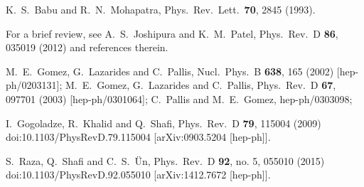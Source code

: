 \documentclass[12pt]{article}
\begin{document}
\begin{thebibliography}{99}
  K.~S.~Babu and R.~N.~Mohapatra,
  Phys.\ Rev.\ Lett.\  {\bf 70}, 2845 (1993).

 For a brief review, see  A.~S.~Joshipura and K.~M.~Patel,
  Phys.\ Rev.\ D {\bf 86}, 035019 (2012) and references therein.

  M.~E.~Gomez, G.~Lazarides and C.~Pallis,
  Nucl.\ Phys.\ B {\bf 638}, 165 (2002)
  [hep-ph/0203131];
  M.~E.~Gomez, G.~Lazarides and C.~Pallis,
  Phys.\ Rev.\ D {\bf 67}, 097701 (2003)
  [hep-ph/0301064];
  C.~Pallis and M.~E.~Gomez,
  hep-ph/0303098;

  I.~Gogoladze, R.~Khalid and Q.~Shafi,
  Phys.\ Rev.\ D {\bf 79}, 115004 (2009)
  doi:10.1103/PhysRevD.79.115004
  [arXiv:0903.5204 [hep-ph]].

  S.~Raza, Q.~Shafi and C.~S.~Ün,
  Phys.\ Rev.\ D {\bf 92}, no. 5, 055010 (2015)
  doi:10.1103/PhysRevD.92.055010
  [arXiv:1412.7672 [hep-ph]].


\end{thebibliography}
\end{document}
